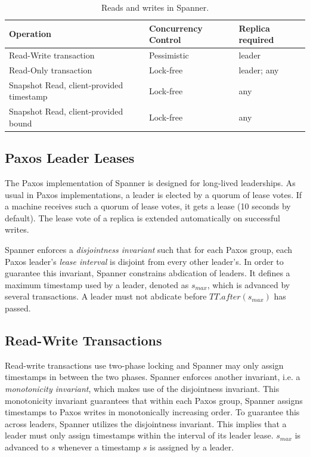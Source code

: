\documentclass[onecolumn, a4paper, 10pt]{article}
\begin{document}
\begin{table}
  \centering
  \begin{tabular}{|l||l|l|}
    \hline
    {\bfseries Operation} & {\bfseries Concurrency Control} &
    {\bfseries Replica required} \tabularnewline
    \hline\hline
    Read-Write transaction & Pessimistic & leader \tabularnewline
    \hline
    Read-Only transaction & Lock-free & leader; any
    \tabularnewline
    \hline
    Snapshot Read, client-provided timestamp & Lock-free & any \tabularnewline
    \hline
    Snapshot Read, client-provided bound & Lock-free & any \tabularnewline
    \hline
  \end{tabular}
  \caption{Reads and writes in Spanner.}
  \label{tbl:reads-writes}
\end{table}

\subsection{Paxos Leader Leases}
\label{subsec:paxos-leader-leases}

The Paxos implementation of Spanner is designed for long-lived leaderships. As
usual in Paxos implementations, a leader is elected by a quorum of lease votes.
If a machine receives such a quorum of lease votes, it gets a lease (10 seconds
by default). The lease vote of a replica is extended automatically on successful
writes.

Spanner enforces a \emph{disjointness invariant} such that for each Paxos group,
each Paxos leader's \emph{lease interval} is disjoint from every other leader's.
In order to guarantee this invariant, Spanner constrains abdication of leaders.
It defines a maximum timestamp used by a leader, denoted as $s_{max}$, which is
advanced by several transactions. A leader must not abdicate before
$TT.after\left(s_{max}\right)$ has passed.

\subsection{Read-Write Transactions}
\label{subsec:read-write-transactions}

Read-write transactions use two-phase locking and Spanner may only assign
timestamps in between the two phases. Spanner enforces another invariant, i.e. a
\emph{monotonicity invariant}, which makes use of the disjointness invariant.
This monotonicity invariant guarantees that within each Paxos group, Spanner
assigns timestamps to Paxos writes in monotonically increasing order. To guarantee
this across leaders, Spanner utilizes the disjointness invariant. This implies
that a leader must only assign timestamps within the interval of its leader
lease. $s_{max}$ is advanced to $s$ whenever a timestamp $s$ is assigned by a
leader.
\end{document}

